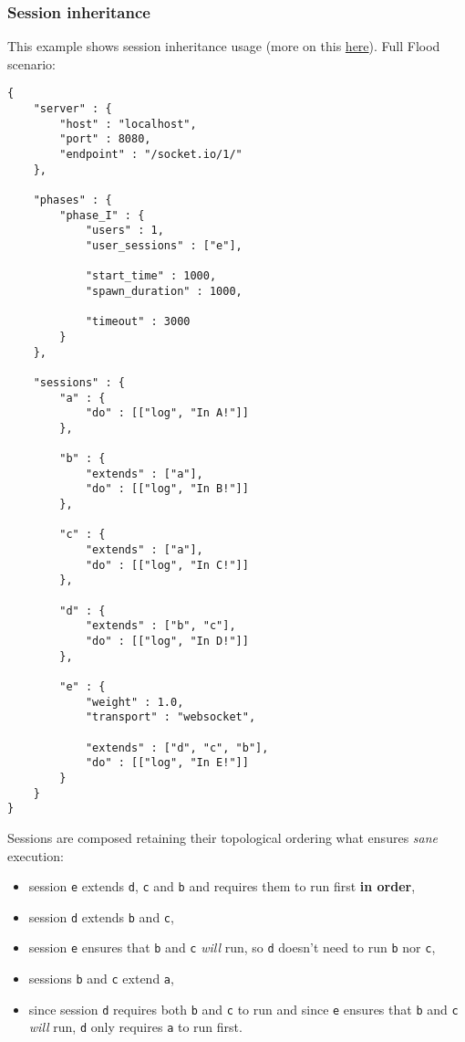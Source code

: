 \documentclass[a4paper]{article}
\begin{document}
\subsubsection{Session inheritance}
\label{sec-3-7-1}

This example shows session inheritance usage (more on this \hyperref[sec-2-2]{here}). Full Flood scenario:


\begin{verbatim}
{
    "server" : {
        "host" : "localhost",
        "port" : 8080,
        "endpoint" : "/socket.io/1/"
    },

    "phases" : {
        "phase_I" : {
            "users" : 1,
            "user_sessions" : ["e"],

            "start_time" : 1000,
            "spawn_duration" : 1000,

            "timeout" : 3000
        }
    },

    "sessions" : {
        "a" : {
            "do" : [["log", "In A!"]]
        },

        "b" : {
            "extends" : ["a"],
            "do" : [["log", "In B!"]]
        },

        "c" : {
            "extends" : ["a"],
            "do" : [["log", "In C!"]]
        },

        "d" : {
            "extends" : ["b", "c"],
            "do" : [["log", "In D!"]]
        },

        "e" : {
            "weight" : 1.0,
            "transport" : "websocket",

            "extends" : ["d", "c", "b"],
            "do" : [["log", "In E!"]]
        }
    }
}
\end{verbatim}




\noindent
Sessions are composed retaining their topological ordering what ensures \emph{sane} execution:

\begin{itemize}
\item session \texttt{e} extends \texttt{d}, \texttt{c} and \texttt{b} and requires them to run first \textbf{in order},
\item session \texttt{d} extends \texttt{b} and \texttt{c},
\item session \texttt{e} ensures that \texttt{b} and \texttt{c} \emph{will} run, so \texttt{d} doesn't need to run \texttt{b} nor \texttt{c},
\item sessions \texttt{b} and \texttt{c} extend \texttt{a},
\item since session \texttt{d} requires both \texttt{b} and \texttt{c} to run and since \texttt{e} ensures that \texttt{b} and \texttt{c} \emph{will} run, \texttt{d} only requires \texttt{a} to run first.
\end{itemize}
\end{document}
